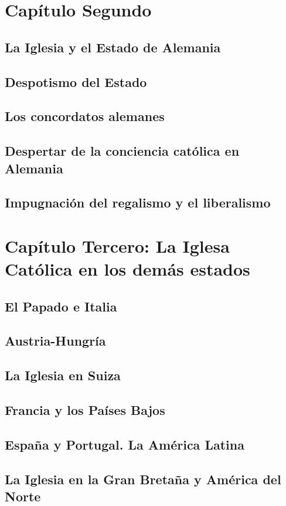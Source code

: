 \raggedbottom{} \documentclass[12pt, a4paper, openany]{book} %
\begin{document}
\chapter{Capítulo Segundo}
\section{La Iglesia y el Estado de Alemania}
\section{Despotismo del Estado}
\section{Los concordatos alemanes}
\section{Despertar de la conciencia católica en Alemania}
\section{Impugnación del regalismo y el liberalismo}
\chapter{Capítulo Tercero: La Iglesa Católica en los demás estados}
\section{El Papado e Italia}
\section{Austria-Hungría}
\section{La Iglesia en Suiza}
\section{Francia y los Países Bajos}
\section{España y Portugal. La América Latina}
\section{La Iglesia en la Gran Bretaña y América del Norte}
\end{document}
